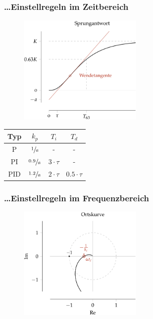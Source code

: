 \documentclass[
  10pt,
  a4paper,
]{article}
\numberwithin{equation}{section}
\begin{document}
\begin{multicols}{2}
\begin{tcolorbox}
\begin{figure}[H]
{}

\end{figure}

\end{tcolorbox}

\hypertarget{einstellregeln-im-zeitbereich}{%
\subsubsection{\ldots Einstellregeln im
Zeitbereich}\label{einstellregeln-im-zeitbereich}}

\begin{figure}[H]

{\centering \includegraphics[width=6cm,height=\textheight]{images/paste-25.png}

}

\end{figure}

\begin{longtable}[]{@{}cccc@{}}
\toprule\noalign{}
Typ & \(k_p\) & \(T_i\) & \(T_d\) \\
\midrule\noalign{}
\endhead
\bottomrule\noalign{}
\endlastfoot
P & \(\sfrac{1}{a}\) & - & - \\
PI & \(\sfrac{0.9}{a}\) & \(3\cdot\tau\) & - \\
PID & \(\sfrac{1.2}{a}\) & \(2\cdot\tau\) & \(0.5\cdot\tau\) \\
\end{longtable}

\hypertarget{einstellregeln-im-frequenzbereich}{%
\subsubsection{\ldots Einstellregeln im
Frequenzbereich}\label{einstellregeln-im-frequenzbereich}}

\begin{figure}[H]

{\centering \includegraphics[width=6cm,height=\textheight]{images/paste-26.png}

}
\end{figure}
\end{multicols}
\end{document}
